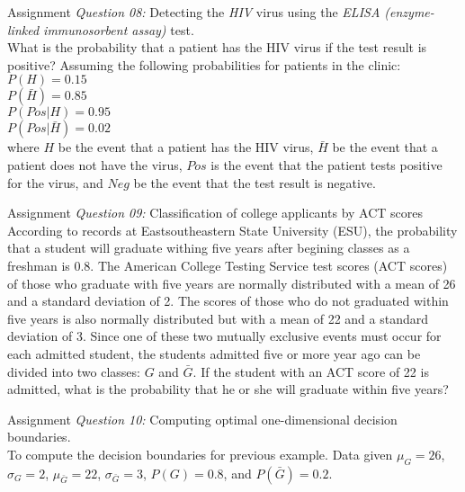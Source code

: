 \begin{frame}{Assignment}
\textit{\color{slidecolor}Question 08:} {Detecting the \textit{HIV} virus using the \textit{ELISA (enzyme-linked immunosorbent assay)} test.}\\
What is the probability that a patient has the HIV virus if the test result is positive?
Assuming the following probabilities for patients in the clinic:\\
\hspace{2cm}$P(H)=0.15$\\
\hspace{2cm}$P(\bar{H})=0.85$\\
\hspace{2cm}$P(Pos|{H})=0.95$\\
\hspace{2cm}$P(Pos|\bar{H})=0.02$\\
where $H$ be the event that a patient has the HIV virus, $\bar{H}$ be the event that a patient does not have the virus, $Pos$ is the event that the patient tests positive for the virus, and $Neg$ be the event that the test result is negative.
\end{frame}

\begin{frame}{Assignment}
\textit{\color{slidecolor}Question 09:} {\color{slidecolor}Classification of college applicants by ACT scores}\\
According to records at Eastsoutheastern State University (ESU), the probability that a student will graduate withing five years after begining classes as a freshman is 0.8. The American College Testing Service test scores (ACT scores) of those who graduate with five years are normally distributed with a mean of 26 and a standard deviation of 2. The scores of those who do not graduated within five years is also normally distributed but with a mean of 22 and a standard deviation of 3. Since one of these two mutually exclusive events must occur for each admitted student, the students admitted five or more year ago can be divided into two classes: $G$ and $\bar{G}$. If the student with an ACT score of 22 is admitted, what is the probability that he or she will graduate within five years?
\end{frame}

\begin{frame}{Assignment}
\textit{\color{slidecolor}Question 10:} {\color{slidecolor}Computing optimal one-dimensional decision boundaries.}\\
To compute the decision boundaries for previous example. Data given $\mu_{G}=26$, $\sigma_G=2$, $\mu_{\bar{G}}=22$, $\sigma_{\bar{G}}=3$, $P(G)=0.8$, and $P(\bar{G})=0.2$.
\end{frame}

